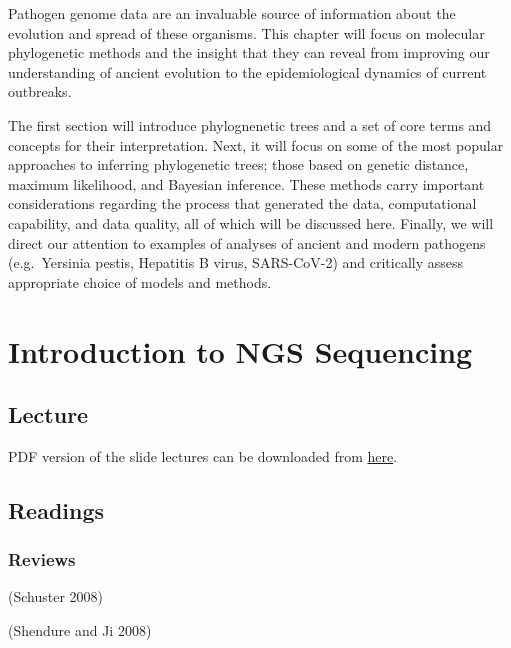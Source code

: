 \documentclass[
  letterpaper,
]{book}
\begin{document}
Pathogen genome data are an invaluable source of information about the
evolution and spread of these organisms. This chapter will focus on
molecular phylogenetic methods and the insight that they can reveal from
improving our understanding of ancient evolution to the epidemiological
dynamics of current outbreaks.

The first section will introduce phylognenetic trees and a set of core
terms and concepts for their interpretation. Next, it will focus on some
of the most popular approaches to inferring phylogenetic trees; those
based on genetic distance, maximum likelihood, and Bayesian inference.
These methods carry important considerations regarding the process that
generated the data, computational capability, and data quality, all of
which will be discussed here. Finally, we will direct our attention to
examples of analyses of ancient and modern pathogens (e.g.~Yersinia
pestis, Hepatitis B virus, SARS-CoV-2) and critically assess appropriate
choice of models and methods.

\hypertarget{introduction-to-ngs-sequencing-1}{%
\chapter{Introduction to NGS
Sequencing}\label{introduction-to-ngs-sequencing-1}}

\hypertarget{lecture}{%
\section{Lecture}\label{lecture}}

PDF version of the slide lectures can be downloaded from
\href{https://raw.githubusercontent.com/SPAAM-community/wss-summer-school/main/docs/assets/slides/2022/1a-intro-to-ngs/SPAAM\%20Summer\%20School\%202022\%20-\%201A\%20-\%20Introduction\%20to\%20NGS\%20Data.pdf}{here}.

\hypertarget{readings}{%
\section{Readings}\label{readings}}

\hypertarget{reviews}{%
\subsection{Reviews}\label{reviews}}

(Schuster 2008)

(Shendure and Ji 2008)
\end{document}
